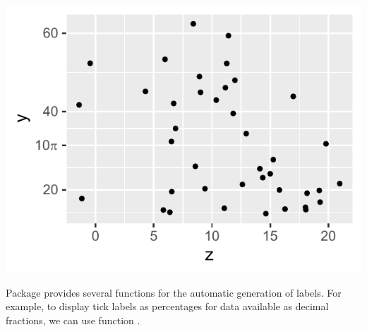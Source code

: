 \documentclass[krantz2]{krantz}\usepackage{knitr}
\begin{document}
\begin{knitrout}\footnotesize
{}\color{fgcolor}\begin{kframe}
\begin{alltt}
  \hlopt{+}
  \hlstd{()} \hlopt{+}
  \hlstd{(} \hlstd{=} \hlstd{(} \hlopt{*} \hlstd{,} \hlstd{,} \hlstd{),}
                      \hlstd{=} \hlstd{(}\hlstd{,} \hlstd{(}\hlopt{*} \hlstd{,} \hlstd{))}
\end{alltt}
\end{kframe}

{\centering \includegraphics[width=.54\textwidth]{figure/pos-scale-ticks-02-1}

}



\end{knitrout}

Package  provides several functions for the automatic generation of labels. For example, to display tick labels as percentages for data available as decimal fractions, we can use function .
\end{document}
